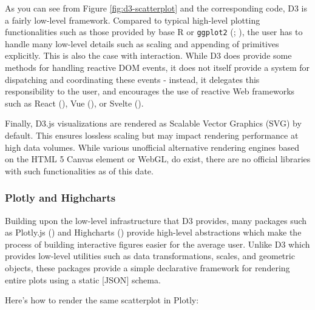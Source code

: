 \documentclass[
]{book}
\begin{document}
As you can see from Figure \ref{fig:d3-scatterplot} and the corresponding code, D3 is a fairly low-level framework. Compared to typical high-level plotting functionalities such as those provided by base R or \texttt{ggplot2} (; ), the user has to handle many low-level details such as scaling and appending of primitives explicitly. This is also the case with interaction. While D3 does provide some methods for handling reactive DOM events, it does not itself provide a system for dispatching and coordinating these events - instead, it delegates this responsibility to the user, and encourages the use of reactive Web frameworks such as React (), Vue (), or Svelte ().

Finally, D3.js visualizations are rendered as Scalable Vector Graphics (SVG) by default. This ensures lossless scaling but may impact rendering performance at high data volumes. While various unofficial alternative rendering engines based on the HTML 5 Canvas element or WebGL, do exist, there are no official libraries with such functionalities as of this date.

\subsubsection{Plotly and Highcharts}\label{plotly-and-highcharts}

Building upon the low-level infrastructure that D3 provides, many packages such as Plotly.js () and Highcharts () provide high-level abstractions which make the process of building interactive figures easier for the average user. Unlike D3 which provides low-level utilities such as data transformations, scales, and geometric objects, these packages provide a simple declarative framework for rendering entire plots using a static {[}JSON{]} schema.

Here's how to render the same scatterplot in Plotly:
\end{document}
